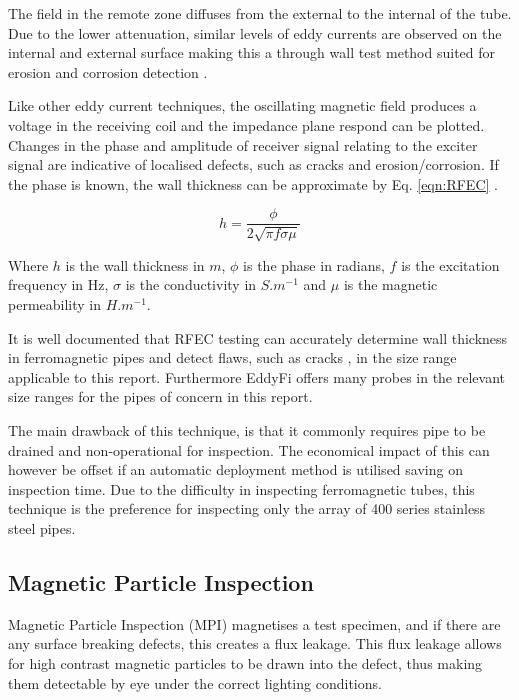 \documentclass[a4paper,twoside,11pt]{article}
\begin{document}
The field in the remote zone diffuses from the external to the internal of the tube.
Due to the lower attenuation, similar levels of eddy currents are observed on the internal and external surface making this a through wall test method suited for erosion and corrosion detection \cite{halmshawIntroductionNondestructiveTesting1996}. 

Like other eddy current techniques, the oscillating magnetic field produces a voltage in the receiving coil and the impedance plane respond can be plotted. 
Changes in the phase and amplitude of receiver signal relating to the exciter signal are indicative of localised defects, such as cracks and erosion/corrosion. If the phase is known, the wall thickness can be approximate by Eq. \ref{eqn:RFEC} \cite{zhangStudyQuantifyingThickness2018}.

\begin{equation} \label{eqn:RFEC}
h=\frac{\phi}{2 \sqrt{\pi f \sigma \mu}}
\end{equation}

\noindent Where $h$ is the wall thickness in $m$, $\phi$ is the phase in radians,  $f$  is the excitation frequency in Hz, $\sigma{}$ is the conductivity in  $S.m^{-1}$  and $\mu{}$ is the magnetic permeability in  $H.m^{-1}$.

It is well documented that RFEC testing can accurately determine wall thickness in ferromagnetic pipes \cite{zhangStudyQuantifyingThickness2018} and detect flaws, such as cracks \cite{yushisunFiniteElementModelling1992}, in the size range applicable to this report. 
Furthermore EddyFi \cite{eddyfiRemoteFieldTestingRFT} offers many probes in the relevant size ranges for the pipes of concern in this report.

The main drawback of this technique, is that it commonly requires pipe to be drained and non-operational for inspection. The economical impact of this can however be offset if an automatic deployment method is utilised saving on inspection time. 
Due to the difficulty in inspecting ferromagnetic tubes, this technique is the preference for inspecting only the array of 400 series stainless steel pipes.

\subsection{Magnetic Particle Inspection}

Magnetic Particle Inspection (MPI) magnetises a test specimen, and if there are any surface breaking defects, this creates a flux leakage. 
This flux leakage allows for high contrast magnetic particles to be drawn into the defect, thus making them detectable by eye under the correct lighting conditions. 
\end{document}
